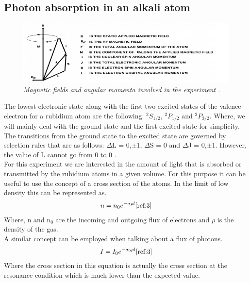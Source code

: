 \documentclass[twocolumn]{article}
\begin{document}
\subsection{Photon absorption in an alkali atom}
\begin{figure}
\begin{minipage}[t]{\textwidth}
\includegraphics[width=\linewidth]{pictures/all-vectors.png}
\caption{\textit{Magnetic fields and angular momenta involved in the experiment 
\cite{ref:3}.}}
\label{fig:8}
\end{minipage}
\end{figure}
The lowest electronic state along with the first two excited states of the 
valence electron for a rubidium atom are the following: $^2S_{1/2}$, 
$^2P_{1/2}$ and $^2P_{3/2}$. Where, we will mainly deal with the ground state 
and the first excited state for simplicity.
\\
The transitions from the ground state to the excited state are governed by 
selection rules that are as follows: $\Delta$L = 0,$\pm$1, $\Delta$S = 0 and 
$\Delta$J = 0,$\pm$1. However, the value of L cannot go from 0 to 0 
\cite{ref:3}.
\\
For this experiment we are interested in the amount of light that is absorbed 
or transmitted by the rubidium atoms in a given volume. For this purpose it can 
be useful to use the concept of a cross section of the atoms. In the limit of 
low density this can be represented as.
\begin{equation}
n = n_0e^{-\sigma\rho l}
\label{eqn:15}
\cite{ref:3}
\end{equation}
Where, n and n$_0$ are the incoming and outgoing flux of electrons and $\rho$ 
is the density of the gas.
\\
A similar concept can be employed when talking about a flux of photons.
\begin{equation}
I = I_0 e^{-\sigma_0\rho l}
\label{eqn:16}
\cite{ref:3}
\end{equation}
Where the cross section in this equation is actually the cross section at the 
resonance condition which is much lower than the expected value.
\end{document}
